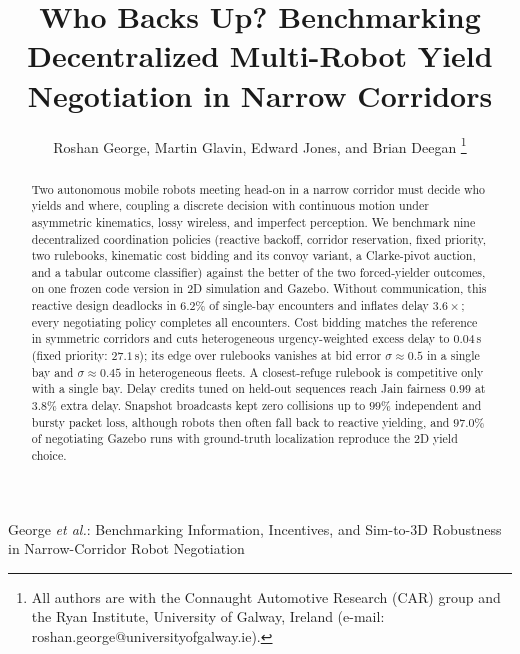 \documentclass[lettersize,journal]{IEEEtran}
\begin{document}

\title{Who Backs Up? Benchmarking Decentralized Multi-Robot Yield Negotiation in Narrow Corridors}


\author{Roshan George, Martin Glavin, Edward Jones, and Brian Deegan%
\thanks{All authors are with the Connaught Automotive Research (CAR) group and the Ryan Institute, University of Galway, Ireland (e-mail: roshan.george@universityofgalway.ie).}}

%
{George \MakeLowercase{\textit{et al.}}: Benchmarking Information, Incentives, and Sim-to-3D Robustness in Narrow-Corridor Robot Negotiation}

\maketitle

\begin{abstract}
Two autonomous mobile robots meeting head-on in a narrow corridor must decide who yields and where, coupling a discrete decision with continuous motion under asymmetric kinematics, lossy wireless, and imperfect perception. We benchmark nine decentralized coordination policies (reactive backoff, corridor reservation, fixed priority, two rulebooks, kinematic cost bidding and its convoy variant, a Clarke-pivot auction, and a tabular outcome classifier) against the better of the two forced-yielder outcomes, on one frozen code version in 2D simulation and Gazebo. Without communication, this reactive design deadlocks in $6.2\%$ of single-bay encounters and inflates delay $3.6\times$; every negotiating policy completes all encounters. Cost bidding matches the reference in symmetric corridors and cuts heterogeneous urgency-weighted excess delay to $0.04$\,s (fixed priority: $27.1$\,s); its edge over rulebooks vanishes at bid error $\sigma\approx0.5$ in a single bay and $\sigma\approx0.45$ in heterogeneous fleets. A closest-refuge rulebook is competitive only with a single bay. Delay credits tuned on held-out sequences reach Jain fairness $0.99$ at $3.8\%$ extra delay. Snapshot broadcasts kept zero collisions up to $99\%$ independent and bursty packet loss, although robots then often fall back to reactive yielding, and $97.0\%$ of negotiating Gazebo runs with ground-truth localization reproduce the 2D yield choice.
\end{abstract}
\end{document}
